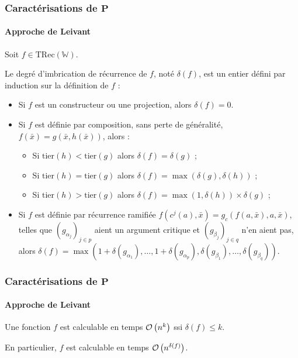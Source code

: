 \documentclass[10pt]{beamer}
\newcommand{\TRec}[1]{\text{TRec}\left(\mathbb{#1}\right)}
\begin{document}
	\begin{frame}
		\frametitle{Caractérisations de $\textbf{P}$}
		\framesubtitle{Approche de Leivant}
		
		
		\begin{defn}
			
			Soit $f \in \TRec{W}$. 
			
			Le degré d'imbrication de récurrence de $f$, noté $\delta(f)$, est un entier défini par induction sur la définition de $f$ :
			
			\begin{itemize}[itemsep=-1mm]
				\item 	Si $f$ est un constructeur ou une projection, alors $\delta(f) = 0$.
				\item 	Si $f$ est définie par composition, sans perte de généralité, $f(\bar{x}) = g\left( \bar{x}, h\left( \bar{x}\right)\right)$, alors :
				
				\begin{itemize}[itemsep=-1mm]
					\item 	Si $\text{tier}(h) < \text{tier}(g)$ alors $\delta(f) = \delta(g)$ ;
					\item 	Si $\text{tier}(h) = \text{tier}(g)$ alors $\delta(f) = \max\left(\delta(g), \delta(h)\right)$ ;
					\item 	Si $\text{tier}(h) > \text{tier}(g)$ alors $\delta(f) = \max\left(1, \delta(h)\right) \times \delta(g)$ ;
				\end{itemize}
				
				\item 	Si $f$ est définie par récurrence ramifiée $f(c^j(a), \bar{x}) = g_{c}\left( f(a, \bar{x}), a, \bar{x} \right)$, telles que $\left( g_{\alpha_j}\right)_{j\in p}$ aient un argument critique et $\left( g_{\beta_j}\right)_{j\in q}$ n'en aient pas, alors $\delta(f) = \max\left( 1 + \delta\left( g_{\alpha_1} \right), \dots,  1 + \delta\left( g_{\alpha_p} \right), \delta\left( g_{\beta_1} \right), \dots,  \delta\left( g_{\beta_q} \right)\right)$. 
			\end{itemize}
		\end{defn}
	\end{frame}
	
	\begin{frame}
		\frametitle{Caractérisations de $\textbf{P}$}
		\framesubtitle{Approche de Leivant}
		
		\begin{thm}
			Une fonction $f$ est calculable en temps $\mathcal{O}\left( n^k \right)$ ssi $\delta(f) \leqslant k$.
			
			En particulier, $f$ est calculable en temps $\mathcal{O}\left( n^{\delta(f)} \right)$.
		\end{thm}
		
		
	\end{frame}
	
\end{document}
